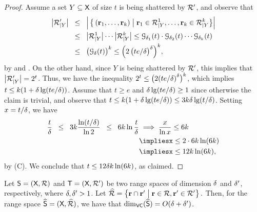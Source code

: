 \begin{proof}
    Assume a set $Y \subseteq \textsf{X}$ of size $t$ is being
    shattered by $\mathcal{R}'$, and observe that
    \begin{align*}
        \bigl| \VCProj{\RangeSetA}{Y} \bigr|%
        &%
        \LEQ%
        \cardin{\,%
           \Set{\,%
              \pth[]{ \range_1, \ldots, \range_k}
           }{ \range_1 \in \smash{\VCProj{\RangeSet^1}{Y}}, \ldots,
              \range_k \in \smash{\VCProj{\RangeSet^k}{Y}} \bigr.} \Bigr. }%
        \\&
        \LEQ%
        \cardin{\smash{\VCProj{\RangeSet^1}{Y}} \bigr.} \cdots
        \cardin{\smash{\VCProj{\RangeSet^k}{Y}}\bigr.}%
        \leq%
        {\Growth{\Dim_1}{t}}
        \cdot {\Growth{\Dim_2}{t}} \cdots
        {\Growth{\Dim_k}{t}}%
      \\
      &\LEQ%
        \pth{\bigl. \Growth{\Dim}{t}}^k%
        \leq%
        \Bigl( 2\, \bigl(
        {t e}/{\Dim} \bigr)^\Dim \Bigr)^k ,
    \end{align*}
    by  and . On the other hand,
    since $Y$ is being shattered by $\mathcal{R}'$, this implies that
    $\bigl| \mathcal{R}'_{|Y}\bigr| = 2^t$. Thus, we have the
    inequality
    $2^t \leq \bigl( 2 \pth{ \nfrac{t e}{\Dim}}^\Dim \bigr)^k$, which
    implies $t \leq k \pth{ 1 + \Dim \lg(\nfrac{t e}{\Dim }) }$.
    Assume that $t \geq e$ and
    $\Dim \lg\pth{\nfrac{t e}{\Dim }} \geq 1$ since otherwise the
    claim is trivial, and observe that
    $t \leq k \pth{ 1 + \Dim \lg\pth{\nfrac{t e}{\Dim }} } \leq 3 k
    \Dim \lg (t/ \Dim)$.  Setting $x = t/\delta$, we have
    \begin{align*}
        \frac{t}{\Dim}%
        \LEQ%
        3k \frac{\ln\pth{ \nfrac{t}{\Dim}}}{\ln 2} %
        \LEQ%
        6k \ln \frac{t}{\Dim}%
        &\implies%
        \frac{x}{\ln x} \leq 6k%
        \\&
        \implies%
        x \leq 2 \cdot 6k \ln \pth{ 6k }%
        \\&
        \implies%
        x \leq 12 k \ln (6 k ),
    \end{align*}
    by (C).  We conclude that
    $t \leq 12 \delta k \ln (6 k )$, as claimed.
\end{proof}




\begin{corollary}
    Let $\mathsf{S} =(\textsf{X}, {\mathcal{R}})$ and $\mathsf{T} =
    (\textsf{X}, \mathcal{R}')$ be two range spaces of \VC dimension
    $\delta$ and $\delta'$, respectively, where $\delta,\delta' > 1$. Let
    \begin{math}
        \widehat{\RangeSet}%
        =%
        \Set{ \range \cap \rangeA }{ \range \in \RangeSet, \rangeA \in
           \RangeSetA \bigr.}.
    \end{math}
      Then, for the range
    space $\widehat{\mathsf{S}} = (\textsf{X}, \widehat{{\mathcal{R}}})$,
    we have that $\mathrm{dim}_{\mathsf{VC}}( \widehat{\mathsf{S}} ) = O( \delta + \delta')$.
\end{corollary}


